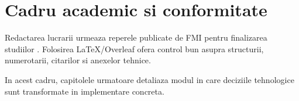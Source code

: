 \section{Cadru academic si conformitate}

Redactarea lucrarii urmeaza reperele publicate de FMI pentru finalizarea studiilor \parencite{fmi2026finalizare}. Folosirea LaTeX/Overleaf ofera control bun asupra structurii, numerotarii, citarilor si anexelor tehnice.

In acest cadru, capitolele urmatoare detaliaza modul in care deciziile tehnologice sunt transformate in implementare concreta.
